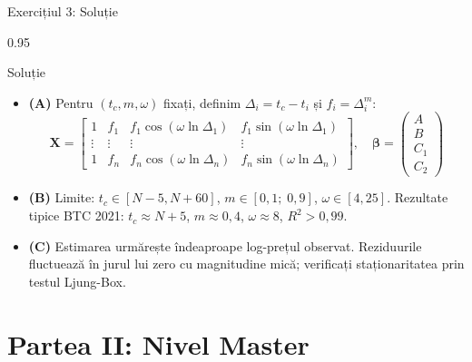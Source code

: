 \documentclass[9pt, aspectratio=169, t]{beamer}
\begin{document}
\begin{frame}{Exercițiul 3: Soluție}
    \begin{cminipage}{0.95\textwidth}
    \begin{exampleblock}{Soluție}
        {\footnotesize
        \begin{itemize}\setlength{\itemsep}{3pt}
            \item \textcolor{MainBlue}{\textbf{(A)}} Pentru $(t_c, m, \omega)$ fixați, definim $\Delta_i = t_c - t_i$ și $f_i = \Delta_i^m$:
            \[
                \mathbf{X} = \begin{bmatrix} 1 & f_1 & f_1\cos(\omega\ln\Delta_1) & f_1\sin(\omega\ln\Delta_1) \\ \vdots & \vdots & \vdots & \vdots \\ 1 & f_n & f_n\cos(\omega\ln\Delta_n) & f_n\sin(\omega\ln\Delta_n) \end{bmatrix}, \quad \boldsymbol{\beta} = \begin{pmatrix} A \\ B \\ C_1 \\ C_2 \end{pmatrix}
            \]
            \item \textcolor{MainBlue}{\textbf{(B)}} Limite: $t_c \in [N{-}5, N{+}60]$, $m \in [0{,}1;\; 0{,}9]$, $\omega \in [4, 25]$. Rezultate tipice BTC 2021: $t_c \approx N + 5$, $m \approx 0{,}4$, $\omega \approx 8$, $R^2 > 0{,}99$.
            \item \textcolor{MainBlue}{\textbf{(C)}} Estimarea urmărește îndeaproape log-prețul observat. Reziduurile fluctuează în jurul lui zero cu magnitudine mică; verificați staționaritatea prin testul Ljung-Box.
        \end{itemize}
        }
    \end{exampleblock}
    \end{cminipage}
\end{frame}

\section{Partea II: Nivel Master}
\end{document}
